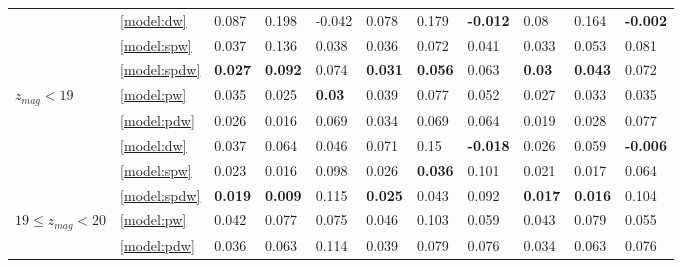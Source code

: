 \documentclass[fleqn,usenatbib]{mnras}
\begin{document}
\begin{table}
\begin{tabular}{lllllllllll}
                                   & \ref{model:dw} &                0.087 &           0.198 &           -0.042 &            0.078 &           0.179 &  \textbf{-0.012} &             0.08 &           0.164 &  \textbf{-0.002} \\
                                   & \ref{model:spw} &                0.037 &           0.136 &            0.038 &            0.036 &           0.072 &            0.041 &            0.033 &           0.053 &            0.081 \\
                                   & \ref{model:spdw} &       \textbf{0.027} &  \textbf{0.092} &            0.074 &   \textbf{0.031} &  \textbf{0.056} &            0.063 &    \textbf{0.03} &  \textbf{0.043} &            0.072 \\
\hline
\hline
            $z_{mag} < 19$ & \ref{model:pw} &                0.035 &           0.025 &    \textbf{0.03} &            0.039 &           0.077 &            0.052 &            0.027 &           0.033 &            0.035 \\
                                   & \ref{model:pdw} &                0.026 &           0.016 &            0.069 &            0.034 &           0.069 &            0.064 &            0.019 &           0.028 &            0.077 \\
                                   & \ref{model:dw} &                0.037 &           0.064 &            0.046 &            0.071 &            0.15 &  \textbf{-0.018} &            0.026 &           0.059 &  \textbf{-0.006} \\
                                   & \ref{model:spw} &                0.023 &           0.016 &            0.098 &            0.026 &  \textbf{0.036} &            0.101 &            0.021 &           0.017 &            0.064 \\
                                   & \ref{model:spdw} &       \textbf{0.019} &  \textbf{0.009} &            0.115 &   \textbf{0.025} &           0.043 &            0.092 &   \textbf{0.017} &  \textbf{0.016} &            0.104 \\
\hline
            $19 \leq z_{mag} < 20$ & \ref{model:pw} &                0.042 &           0.077 &            0.075 &            0.046 &           0.103 &            0.059 &            0.043 &           0.079 &            0.055 \\
                                   & \ref{model:pdw} &                0.036 &           0.063 &            0.114 &            0.039 &           0.079 &            0.076 &            0.034 &           0.063 &            0.076 \\

\end{tabular}
\end{table}
\end{document}
